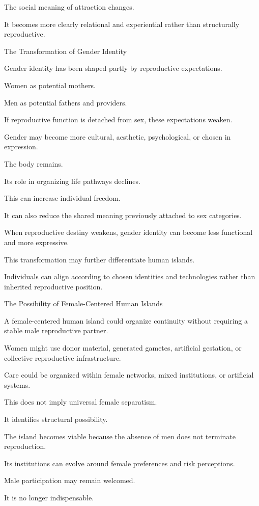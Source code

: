 The social meaning of attraction changes.

It becomes more clearly relational and experiential rather than structurally reproductive.

The Transformation of Gender Identity

Gender identity has been shaped partly by reproductive expectations.

Women as potential mothers.

Men as potential fathers and providers.

If reproductive function is detached from sex, these expectations weaken.

Gender may become more cultural, aesthetic, psychological, or chosen in expression.

The body remains.

Its role in organizing life pathways declines.

This can increase individual freedom.

It can also reduce the shared meaning previously attached to sex categories.

When reproductive destiny weakens, gender identity can become less functional and more expressive.

This transformation may further differentiate human islands.

Individuals can align according to chosen identities and technologies rather than inherited reproductive position.

The Possibility of Female-Centered Human Islands

A female-centered human island could organize continuity without requiring a stable male reproductive partner.

Women might use donor material, generated gametes, artificial gestation, or collective reproductive infrastructure.

Care could be organized within female networks, mixed institutions, or artificial systems.

This does not imply universal female separatism.

It identifies structural possibility.

The island becomes viable because the absence of men does not terminate reproduction.

Its institutions can evolve around female preferences and risk perceptions.

Male participation may remain welcomed.

It is no longer indispensable.

